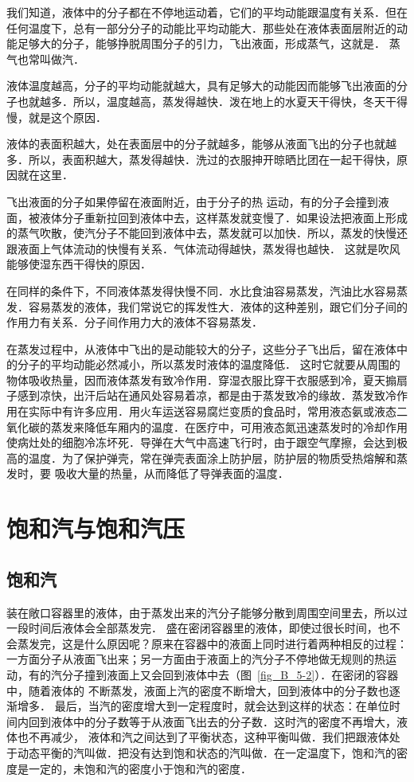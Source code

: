 我们知道，液体中的分子都在不停地运动着，它们的平均动能跟温度有关系．但在任何温度下，总有一部分分子的动能比平均动能大．那些处在液体表面层附近的动能足够大的分子，能够挣脱周围分子的引力，飞出液面，形成蒸气，这就是．
蒸气也常叫做汽．

液体温度越高，分子的平均动能就越大，具有足够大的动能因而能够飞出液面的分子也就越多．所以，温度越高，蒸发得越快．泼在地上的水夏天干得快，冬天干得慢，就是这个原因．

液体的表面积越大，处在表面层中的分子就越多，能够从液面飞出的分子也就越多．所以，表面积越大，蒸发得越快．洗过的衣服抻开晾晒比团在一起干得快，原因就在这里．

飞出液面的分子如果停留在液面附近，由于分子的热
运动，有的分子会撞到液面，被液体分子重新拉回到液体中去，这样蒸发就变慢了．如果设法把液面上形成的蒸气吹散，使汽分子不能回到液体中去，蒸发就可以加快．所以，蒸发的快慢还跟液面上气体流动的快慢有关系．气体流动得越快，蒸发得也越快．
这就是吹风能够使湿东西干得快的原因．

在同样的条件下，不同液体蒸发得快慢不同．水比食油容易蒸发，汽油比水容易蒸发．容易蒸发的液体，我们常说它的挥发性大．液体的这种差别，跟它们分子间的作用力有关系．分子间作用力大的液体不容易蒸发．

在蒸发过程中，从液体中飞出的是动能较大的分子，这些分子飞出后，留在液体中的分子的平均动能必然减小，所以蒸发时液体的温度降低．
这时它就要从周围的物体吸收热量，因而液体蒸发有致冷作用．穿湿衣服比穿干衣服感到冷，夏天搧扇子感到凉快，出汗后站在通风处容易着凉，都是由于蒸发致冷的缘故．蒸发致冷作用在实际中有许多应用．用火车运送容易腐烂变质的食品时，常用液态氨或液态二氧化碳的蒸发来降低车厢内的温度．在医疗中，可用液态氮迅速蒸发时的冷却作用使病灶处的细胞冷冻坏死．导弹在大气中高速飞行时，由于跟空气摩擦，会达到极高的温度．为了保护弹壳，常在弹壳表面涂上防护层，防护层的物质受热熔解和蒸发时，要
吸收大量的热量，从而降低了导弹表面的温度．

\section{饱和汽与饱和汽压}
\subsection{饱和汽} 
装在敞口容器里的液体，由于蒸发出来的汽分子能够分散到周围空间里去，所以过一段时间后液体会全部蒸发完．
盛在密闭容器里的液体，即使过很长时间，也不会蒸发完，这是什么原因呢？原来在容器中的液面上同时进行着两种相反的过程：一方面分子从液面飞出来；另一方面由于液面上的汽分子不停地做无规则的热运动，有的汽分子撞到液面上又会回到液体中去（图~\ref{fig_B_5-2}）．在密闭的容器中，随着液体的
不断蒸发，液面上汽的密度不断增大，回到液体中的分子数也逐渐增多．
最后，当汽的密度增大到一定程度时，就会达到这样的状态：在单位时间内回到液体中的分子数等于从液面飞出去的分子数．这时汽的密度不再增大，液体也不再减少，
液体和汽之间达到了平衡状态，这种平衡叫做．我们把跟液体处于动态平衡的汽叫做．把没有达到饱和状态的汽叫做．在一定温度下，饱和汽的密度是一定的，未饱和汽的密度小于饱和汽的密度．

